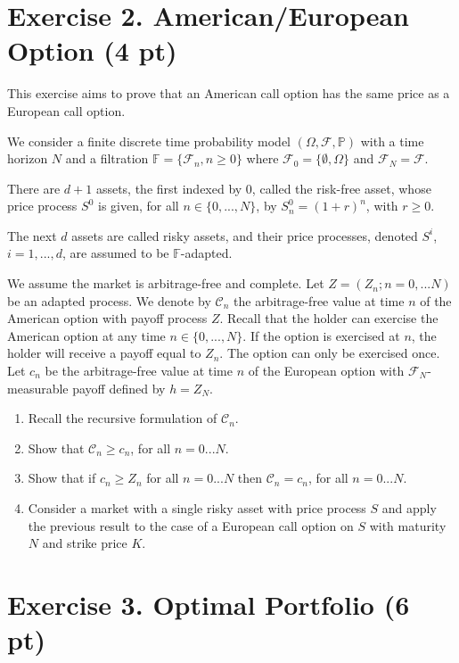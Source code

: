 \documentclass{article}
\begin{document}
\section*{Exercise 2. American/European Option (4 pt)}

This exercise aims to prove that an American call option has the same price as a European call option.

We consider a finite discrete time probability model $(\Omega, \mathcal{F}, \mathbb{P})$ with a time horizon $N$ and a filtration $\mathbb{F}=\{\mathcal{F}_{n},n\ge0\}$ where $\mathcal{F}_{0}=\{\emptyset,\Omega\}$ and $\mathcal{F}_{N}=\mathcal{F}$.

There are $d+1$ assets, the first indexed by 0, called the risk-free asset, whose price process $S^{0}$ is given, for all $n\in\{0,...,N\}$, by $S_{n}^{0}=(1+r)^{n}$, with $r\ge0$.

The next $d$ assets are called risky assets, and their price processes, denoted $S^{i}$, $i=1,...,d$, are assumed to be $\mathbb{F}$-adapted.

We assume the market is arbitrage-free and complete. Let $Z=(Z_{n};n=0,...N)$ be an adapted process. We denote by $\mathcal{C}_{n}$ the arbitrage-free value at time $n$ of the American option with payoff process $Z$. Recall that the holder can exercise the American option at any time $n\in\{0,...,N\}$. If the option is exercised at $n$, the holder will receive a payoff equal to $Z_{n}$. The option can only be exercised once. Let $c_{n}$ be the arbitrage-free value at time $n$ of the European option with $\mathcal{F}_{N}$-measurable payoff defined by $h=Z_{N}$.

\begin{enumerate}
    \item Recall the recursive formulation of $\mathcal{C}_{n}$.
    \item Show that $\mathcal{C}_{n}\ge c_{n}$, for all $n=0...N$.
    \item Show that if $c_{n}\ge Z_{n}$ for all $n=0...N$ then $\mathcal{C}_{n}=c_{n}$, for all $n=0...N$.
    \item Consider a market with a single risky asset with price process $S$ and apply the previous result to the case of a European call option on $S$ with maturity $N$ and strike price $K$.
\end{enumerate}

\section*{Exercise 3. Optimal Portfolio (6 pt)}
\end{document}
